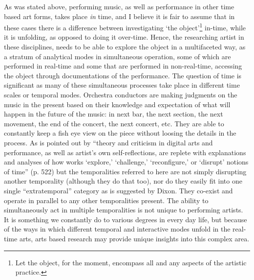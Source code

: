 As was stated above, performing music, as well as performance in other time based art forms, takes place \emph{in} time, and I believe it is fair to assume that in these cases there is a difference between investigating `the object'\footnote{Let the object, for the moment, encompass all and any aspects of the artistic practice.} in-time, while it is unfolding, as opposed to doing it over-time. Hence, the researching artist in these disciplines, needs to be able to explore the object in a multifaceted way, as a stratum of analytical modes in simultaneous operation, some of which are performed in real-time and some that are performed in non-real-time, accessing the object through documentations of the performance. The question of time is significant as many of these simultaneous processes take place in different time scales or temporal modes. %
Orchestra conductors are making judgments on the music in the present based on their knowledge and expectation of what will happen in the future of the music: in next bar, the next section, the next movement, the end of the concert, the next concert, etc. They are able to constantly keep a fish eye view on the piece without loosing the details in the process. %
As is pointed out by \citet{dixon07} ``theory and criticism in digital arts and performance, as well as artist's own self-reflections, are replete with explanations and analyses of how works `explore,' `challenge,' `reconfigure,' or `disrupt' notions of time'' (p. 522) but the temporalities referred to here are not simply disrupting another temporality (although they do that too), nor do they easily fit into one single ``extratemporal'' category as is suggested by Dixon. They co-exist and operate in parallel to any other temporalities present.
The ability to simultaneously act in multiple temporalities is not unique to performing artists. It is something we constantly do to various degrees in every day life, but because of the ways in which different temporal and interactive modes unfold in the real-time arts, arts based research may provide unique insights into this complex area.


